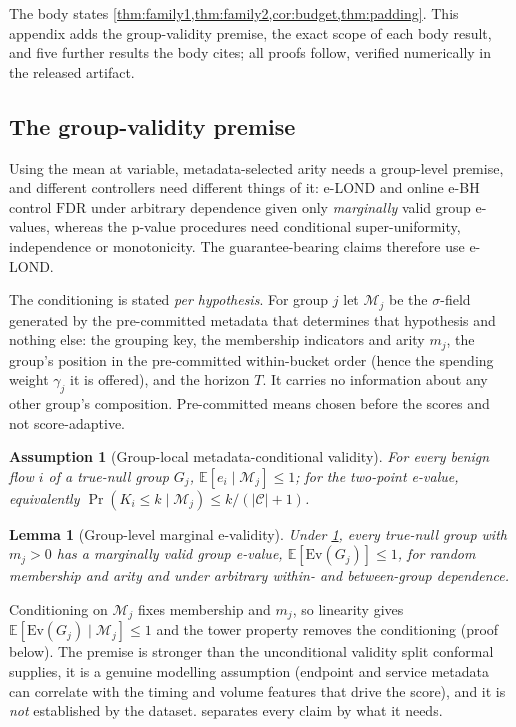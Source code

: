 \documentclass[conference]{IEEEtran}
\newtheorem{lemma}{Lemma}
\newtheorem{assumption}{Assumption}
\newcommand{\Cal}{\mathcal{C}}
\newcommand{\nCal}{\lvert\Cal\rvert}
\newcommand{\Ev}{\mathrm{Ev}}
\newcommand{\FDR}{\mathrm{FDR}}
\begin{document}
The body states \cref{thm:family1,thm:family2,cor:budget,thm:padding}. This appendix adds the
group-validity premise, the exact scope of each body result, and five further results the body cites;
all proofs follow, verified numerically in the released artifact.

\subsection{The group-validity premise}\label{app:groupval}

Using the mean at variable, metadata-selected arity needs a group-level premise, and different
controllers need different things of it: e-LOND and online e-BH control $\FDR$ under arbitrary
dependence given only \emph{marginally} valid group e-values, whereas the p-value procedures need
conditional super-uniformity, independence or monotonicity. The guarantee-bearing claims therefore use
e-LOND.

The conditioning is stated \emph{per hypothesis}. For group $j$ let $\mathcal M_j$ be the
$\sigma$-field generated by the pre-committed metadata that determines that hypothesis and nothing else:
the grouping key, the membership indicators and arity $m_j$, the group's position in the pre-committed
within-bucket order (hence the spending weight $\gamma_j$ it is offered), and the horizon $T$. It
carries no information about any other group's composition. Pre-committed means chosen before the scores
and not score-adaptive.

\begin{assumption}[Group-local metadata-conditional validity]\label{assump:groupval}
For every benign flow $i$ of a true-null group $G_j$, $\mathbb E[e_i\mid\mathcal M_j]\le1$; for the
two-point e-value, equivalently $\Pr(K_i\le k\mid\mathcal M_j)\le k/(\nCal+1)$.
\end{assumption}

\begin{lemma}[Group-level marginal e-validity]\label{lem:groupval}
Under \cref{assump:groupval}, every true-null group with $m_j>0$ has a marginally valid group e-value,
$\mathbb E[\Ev(G_j)]\le1$, for random membership and arity and under arbitrary within- and between-group
dependence.
\end{lemma}

Conditioning on $\mathcal M_j$ fixes membership and $m_j$, so linearity gives
$\mathbb E[\Ev(G_j)\mid\mathcal M_j]\le1$ and the tower property removes the conditioning (proof
below). The premise is stronger than the unconditional validity split conformal supplies, it is a
genuine modelling assumption (endpoint and service metadata can correlate with the timing and volume
features that drive the score), and it is \emph{not} established by the dataset. 
separates every claim by what it needs.
\end{document}
